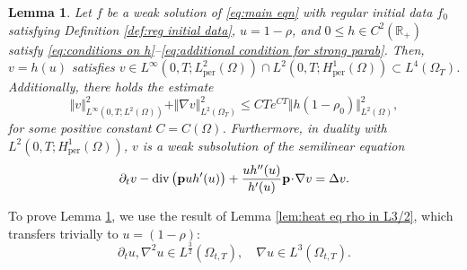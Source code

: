 \documentclass[11pt,a4paper,reqno]{amsart}
\newtheorem{lemma}[prop]{Lemma}
\theoremstyle{remark}
\theoremstyle{definition}
\numberwithin{equation}{section}
\newcommand{\per}{\mathrm{per}}
\DeclareMathOperator{\dv}{div}
\newcommand{\p}{{\bf p}}
\begin{document}
\begin{lemma}\label{prop: w big prop}
    Let $f$ be a weak solution of \eqref{eq:main eqn} with regular initial data $f_0$ satisfying Definition \ref{def:reg initial data}, $u=1-\rho$, and $0 \leq h \in C^2(\mathbb{R}_+)$ satisfy \eqref{eq:conditions on h}--\eqref{eq:additional condition for strong parab}. Then, $v = h(u)$ satisfies $v  \in L^\infty(0,T;L^2_\per(\Omega)) \cap L^2(0,T;H^1_\per(\Omega)) \subset  L^4(\Omega_T) $. Additionally, there holds the estimate 
    \begin{equation}\label{eq: energy est 1 over sqrt}
        \Vert v \Vert^2_{L^\infty(0,T;L^2(\Omega))} + \Vert \nabla v \Vert^2_{L^2(\Omega_T)} \leq   CT e^{C T} \Vert h(1\!-\!\rho_0) \Vert^2_{L^2(\Omega)}, 
    \end{equation}
for some positive constant $C=C(\Omega)$. Furthermore, in duality with $L^2(0,T;H^1_\per(\Omega))$, $v$ is a weak subsolution of the semilinear equation 
    \begin{equation}\label{eq: eqn for w in lem}
   \partial_t v  - \dv\big( \p u h'(u) \big) +  \frac{u h''(u)}{h'(u)}   \p \! \cdot \! \nabla v  = \Delta v. 
\end{equation}
\end{lemma}











To prove Lemma \ref{prop: w big prop}, we use the result of Lemma \ref{lem:heat eq rho in L3/2}, which transfers trivially to $u=(1-\rho)$: 
\begin{equation}\label{eq:schauder u}
    \partial_t u , \nabla^2 u \in L^{\frac{3}{2}}(\Omega_{t,T}), \quad \nabla u \in L^{3}(\Omega_{t,T}) . 
\end{equation}
\end{document}
